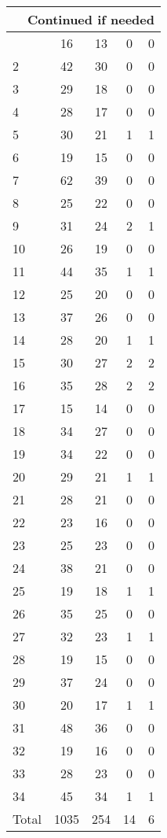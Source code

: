 \begin{center}
\begin{longtable}{l|c|c|c|c}
\hline \multicolumn{5}{|r|}{{Continued if needed}} \\ \hline
\endfoot 
1 & 16 & 13 & 0 & 0\\ \hline
2 & 42 & 30 & 0 & 0\\ \hline
3 & 29 & 18 & 0 & 0\\ \hline
4 & 28 & 17 & 0 & 0\\ \hline
5 & 30 & 21 & 1 & 1\\ \hline
6 & 19 & 15 & 0 & 0\\ \hline
7 & 62 & 39 & 0 & 0\\ \hline
8 & 25 & 22 & 0 & 0\\ \hline
9 & 31 & 24 & 2 & 1\\ \hline
10 & 26 & 19 & 0 & 0\\ \hline
11 & 44 & 35 & 1 & 1\\ \hline
12 & 25 & 20 & 0 & 0\\ \hline
13 & 37 & 26 & 0 & 0\\ \hline
14 & 28 & 20 & 1 & 1\\ \hline
15 & 30 & 27 & 2 & 2\\ \hline
16 & 35 & 28 & 2 & 2\\ \hline
17 & 15 & 14 & 0 & 0\\ \hline
18 & 34 & 27 & 0 & 0\\ \hline
19 & 34 & 22 & 0 & 0\\ \hline
20 & 29 & 21 & 1 & 1\\ \hline
21 & 28 & 21 & 0 & 0\\ \hline
22 & 23 & 16 & 0 & 0\\ \hline
23 & 25 & 23 & 0 & 0\\ \hline
24 & 38 & 21 & 0 & 0\\ \hline
25 & 19 & 18 & 1 & 1\\ \hline
26 & 35 & 25 & 0 & 0\\ \hline
27 & 32 & 23 & 1 & 1\\ \hline
28 & 19 & 15 & 0 & 0\\ \hline
29 & 37 & 24 & 0 & 0\\ \hline
30 & 20 & 17 & 1 & 1\\ \hline
31 & 48 & 36 & 0 & 0\\ \hline
32 & 19 & 16 & 0 & 0\\ \hline
33 & 28 & 23 & 0 & 0\\ \hline
34 & 45 & 34 & 1 & 1\\ \hline
Total & 1035 & 254 & 14 & 6
\end{longtable}
\end{center}



